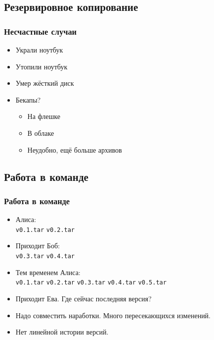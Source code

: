 \documentclass[pdf,russian]{beamer}
\begin{document}
\subsection{Резервировное копирование}

\begin{frame}[fragile]
    \frametitle{Несчастные случаи}
    \begin{itemize}
        \pause
        \item Украли ноутбук
        \pause
        \item Утопили ноутбук
        \pause
        \item Умер жёсткий диск
        \pause
        \item Бекапы?
        \pause
        \begin{itemize}
            \item На флешке
            \item В облаке
            \pause
            \item Неудобно, ещё больше архивов
        \end{itemize}
    \end{itemize}
\end{frame}

\subsection{Работа в команде}

\begin{frame}[fragile]
    \frametitle{Работа в команде}
    \begin{itemize}
        \item Алиса: \\
        \pause
            \texttt{\textcolor[HTML]{aa0000}{v0.1.tar}} \quad
            \texttt{\textcolor[HTML]{aa0000}{v0.2.tar}}
        \pause
        \item Приходит Боб: \\
        \pause
            \texttt{\textcolor[HTML]{aa0000}{v0.3.tar}} \quad
            \texttt{\textcolor[HTML]{aa0000}{v0.4.tar}}
        \pause
        \item Тем временем Алиса: \\
            \texttt{\textcolor[HTML]{aa0000}{v0.1.tar}} \quad
            \texttt{\textcolor[HTML]{aa0000}{v0.2.tar}} \quad
            \texttt{\textcolor[HTML]{aa0000}{v0.3.tar}} \quad
            \texttt{\textcolor[HTML]{aa0000}{v0.4.tar}} \quad
            \texttt{\textcolor[HTML]{aa0000}{v0.5.tar}}
        \pause
        \item Приходит Ева. \pause Где сейчас последняя версия?
        \pause
        \item Надо совместить наработки. \pause Много пересекающихся изменений.
        \pause
        \item Нет линейной истории версий.
    \end{itemize}
\end{frame}
\end{document}
